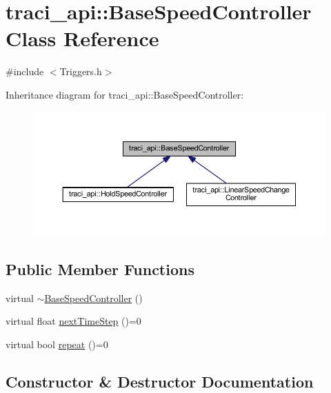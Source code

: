 \hypertarget{classtraci__api_1_1_base_speed_controller}{}\section{traci\+\_\+api\+:\+:Base\+Speed\+Controller Class Reference}
\label{classtraci__api_1_1_base_speed_controller}


{\ttfamily \#include $<$Triggers.\+h$>$}



Inheritance diagram for traci\+\_\+api\+:\+:Base\+Speed\+Controller\+:\nopagebreak
\begin{figure}[H]
\begin{center}
\leavevmode
\includegraphics[width=350pt]{classtraci__api_1_1_base_speed_controller__inherit__graph}
\end{center}
\end{figure}
\subsection*{Public Member Functions}
\begin{DoxyCompactItemize}
\item 
virtual \hyperlink{classtraci__api_1_1_base_speed_controller_a7cabfad7b110f2463c62fe9e1d882043}{$\sim$\+Base\+Speed\+Controller} ()
\item 
virtual float \hyperlink{classtraci__api_1_1_base_speed_controller_ab9658ce36f91de8a34bb710b3241c210}{next\+Time\+Step} ()=0
\item 
virtual bool \hyperlink{classtraci__api_1_1_base_speed_controller_a2d4b22945d4cb27f5fe24b05700021b6}{repeat} ()=0
\end{DoxyCompactItemize}


\subsection{Constructor \& Destructor Documentation}
\mbox{\label{classtraci__api_1_1_base_speed_controller_a7cabfad7b110f2463c62fe9e1d882043}} 
